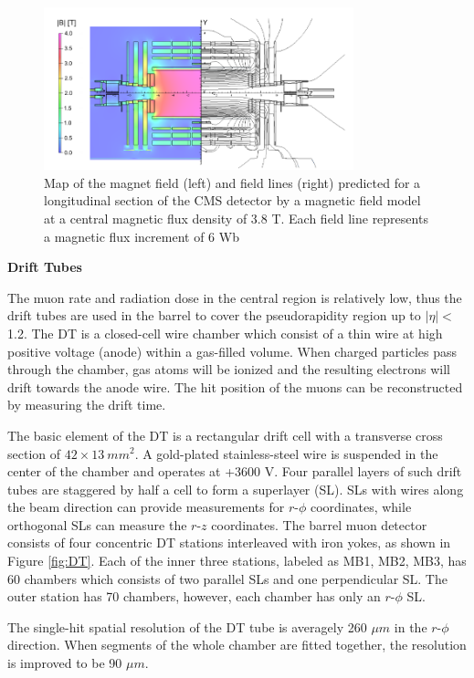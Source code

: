 \documentclass[thesis.tex]{subfiles}
\begin{document}
\begin{figure}[hbtp]
	\centering
	\includegraphics[width=0.8\textwidth]{plot/magnet.png}
	\caption{Map of the magnet field (left) and field lines (right) predicted for a longitudinal section of the CMS detector by a magnetic field model at a central magnetic flux density of 3.8 T. Each field line represents a magnetic flux increment of 6 Wb}
	\label{fig:magnet}
\end{figure}

\noindent \textbf{Drift Tubes} 

The muon rate and radiation dose in the central region is relatively low, thus the drift tubes are used in the barrel to cover the pseudorapidity region up to $|\eta| < $ 1.2.
The DT is a closed-cell wire chamber which consist of a thin wire at high positive voltage (anode) within a gas-filled volume.
When charged particles pass through the chamber, gas atoms will be ionized and the resulting electrons will drift towards the anode wire.
The hit position of the muons can be reconstructed by measuring the drift time.  

The basic element of the DT is a rectangular drift cell with a transverse cross section of $42 \times 13\ mm^2$. 
A gold-plated stainless-steel wire is suspended in the center of the chamber and operates at +3600 V. 
Four parallel layers of such drift tubes are staggered by half a cell to form a superlayer (SL). 
SLs with wires along the beam direction can provide measurements for $r\text{-}\phi$ coordinates, while orthogonal SLs can measure the $r\text{-}z$ coordinates. 
The barrel muon detector consists of four concentric DT stations interleaved with iron yokes, as shown in Figure \ref{fig:DT}.
Each of the inner three stations, labeled as MB1, MB2, MB3, has 60 chambers which consists of two parallel  SLs and one perpendicular SL. 
The outer station has 70 chambers, however, each chamber has only an $r\text{-}\phi$ SL. 

The single-hit spatial resolution of the DT tube is averagely 260 $\mu m$ in the $r\text{-}\phi$ direction.
When segments of the whole chamber are fitted together, the resolution is improved to be 90 $\mu m$.
\end{document}
